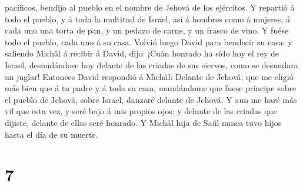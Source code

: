 pacíficos, bendijo al pueblo en el nombre de Jehová de los ejércitos.
 Y repartió á todo el pueblo, y á toda la multitud de
Israel, así á hombres como á mujeres, á cada uno una torta de pan, y un
pedazo de carne, y un frasco de vino. Y fuése todo el pueblo, cada uno á
su casa.  Volvió luego David para bendecir su casa: y
saliendo Michâl á recibir á David, dijo: ¡Cuán honrado ha sido hoy el
rey de Israel, desnudándose hoy delante de las criadas de sus siervos,
como se desnudara un juglar!  Entonces David respondió á
Michâl: Delante de Jehová, que me eligió más bien que á tu padre y á
toda su casa, mandándome que fuese príncipe sobre el pueblo de Jehová,
sobre Israel, danzaré delante de Jehová.  Y aun me haré
más vil que esta vez, y seré bajo á mis propios ojos; y delante de las
criadas que dijiste, delante de ellas seré honrado.  Y
Michâl hija de Saúl nunca tuvo hijos hasta el día de su muerte.

\hypertarget{section-6}{%
\section{7}\label{section-6}}

